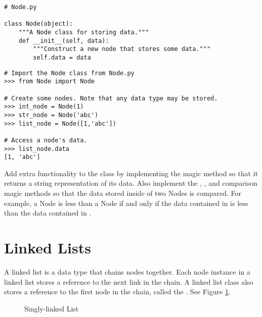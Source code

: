 \begin{lstlisting}
# Node.py

class Node(object):
	"""A Node class for storing data."""
	def __init__(self, data):
		"""Construct a new node that stores some data."""
		self.data = data
\end{lstlisting}

\begin{lstlisting}
# Import the Node class from Node.py
>>> from Node import Node

# Create some nodes. Note that any data type may be stored.
>>> int_node = Node(1)
>>> str_node = Node('abc')
>>> list_node = Node([1,'abc'])

# Access a node's data.
>>> list_node.data
[1, 'abc']
\end{lstlisting}

\begin{problem}
Add extra functionality to the  class by implementing the  magic method so that it returns a string representation of its data.
Also implement the , , and  comparison magic methods so that the data stored inside of two Nodes is compared.
For example, a Node  is less than a Node  if and only if the data contained in  is less than the data contained in .
\end{problem}

\section*{Linked Lists}

A linked list is a data type that chains nodes together.
Each node instance in a linked list stores a reference to the next link in the chain.
A linked list class also stores a reference to the first node in the chain, called the .
See Figure \ref{fig:singly_linked}.

\begin{figure}
\centering
{}
\caption{Singly-linked List}
\label{fig:singly_linked}
\end{figure}

